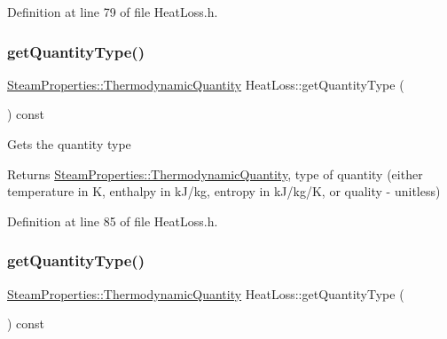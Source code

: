 Definition at line 79 of file Heat\+Loss.\+h.

\mbox{\label{class_heat_loss_a92dc973c0fd81df192207b3df55d6c2b}} 
\subsubsection{\texorpdfstring{get\+Quantity\+Type()}{getQuantityType()}\hspace{0.1cm}{\footnotesize\ttfamily [1/3]}}
{\footnotesize\ttfamily \hyperlink{class_steam_properties_ae0294bedf7d178c2d8fb6aed0f62fbff}{Steam\+Properties\+::\+Thermodynamic\+Quantity} Heat\+Loss\+::get\+Quantity\+Type (\begin{DoxyParamCaption}{ }\end{DoxyParamCaption}) const\hspace{0.3cm}{\ttfamily [inline]}}

Gets the quantity type \begin{DoxyReturn}{Returns}
\hyperlink{class_steam_properties_ae0294bedf7d178c2d8fb6aed0f62fbff}{Steam\+Properties\+::\+Thermodynamic\+Quantity}, type of quantity (either temperature in K, enthalpy in k\+J/kg, entropy in k\+J/kg/K, or quality -\/ unitless) 
\end{DoxyReturn}


Definition at line 85 of file Heat\+Loss.\+h.

\mbox{\label{class_heat_loss_a92dc973c0fd81df192207b3df55d6c2b}} 
\subsubsection{\texorpdfstring{get\+Quantity\+Type()}{getQuantityType()}\hspace{0.1cm}{\footnotesize\ttfamily [2/3]}}
{\footnotesize\ttfamily \hyperlink{class_steam_properties_ae0294bedf7d178c2d8fb6aed0f62fbff}{Steam\+Properties\+::\+Thermodynamic\+Quantity} Heat\+Loss\+::get\+Quantity\+Type (\begin{DoxyParamCaption}{ }\end{DoxyParamCaption}) const\hspace{0.3cm}{\ttfamily [inline]}}

